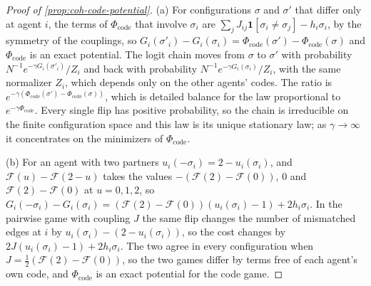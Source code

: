 \begin{proof}[Proof of \cref{prop:coh-code-potential}]
(a) For configurations $\sigma$ and $\sigma'$ that differ only at agent $i$, the terms of $\Phi_{\mathrm{code}}$ that involve $\sigma_i$ are $\sum_jJ_{ij}\mathbf 1[\sigma_i\ne\sigma_j]-h_i\sigma_i$, by the symmetry of the couplings, so $G_i(\sigma'_i)-G_i(\sigma_i)=\Phi_{\mathrm{code}}(\sigma')-\Phi_{\mathrm{code}}(\sigma)$ and $\Phi_{\mathrm{code}}$ is an exact potential. The logit chain moves from $\sigma$ to $\sigma'$ with probability $N^{-1}e^{-\gamma G_i(\sigma'_i)}/Z_i$ and back with probability $N^{-1}e^{-\gamma G_i(\sigma_i)}/Z_i$, with the same normalizer $Z_i$, which depends only on the other agents' codes. The ratio is $e^{-\gamma(\Phi_{\mathrm{code}}(\sigma')-\Phi_{\mathrm{code}}(\sigma))}$, which is detailed balance for the law proportional to $e^{-\gamma\Phi_{\mathrm{code}}}$. Every single flip has positive probability, so the chain is irreducible on the finite configuration space and this law is its unique stationary law; as $\gamma\to\infty$ it concentrates on the minimizers of $\Phi_{\mathrm{code}}$.

(b) For an agent with two partners $u_i(-\sigma_i)=2-u_i(\sigma_i)$, and $\mathcal F(u)-\mathcal F(2-u)$ takes the values $-(\mathcal F(2)-\mathcal F(0))$, $0$ and $\mathcal F(2)-\mathcal F(0)$ at $u=0,1,2$, so $G_i(-\sigma_i)-G_i(\sigma_i)=(\mathcal F(2)-\mathcal F(0))(u_i(\sigma_i)-1)+2h_i\sigma_i$. In the pairwise game with coupling $J$ the same flip changes the number of mismatched edges at $i$ by $u_i(\sigma_i)-(2-u_i(\sigma_i))$, so the cost changes by $2J(u_i(\sigma_i)-1)+2h_i\sigma_i$. The two agree in every configuration when $J=\frac12(\mathcal F(2)-\mathcal F(0))$, so the two games differ by terms free of each agent's own code, and $\Phi_{\mathrm{code}}$ is an exact potential for the code game.


\end{proof}

